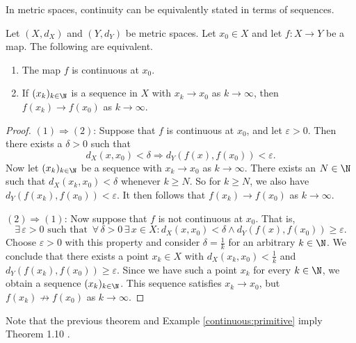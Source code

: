 \np

In metric spaces, continuity can be equivalently stated in terms of sequences.


\begin{theorem}\label{th:sequential}
Let $(X,d_X)$ and $(Y,d_Y)$ be metric spaces. Let $x_0 \in X$ and let $f : X \to Y$
be a map. The following are equivalent.
\begin{enumerate}
\item The map $f$ is continuous at $x_0$.
\item If $(x_k)_{k \in \N}$ is a sequence in $X$ with $x_k \to x_0$ as $k \to \infty$,
then $f(x_k) \to f(x_0)$ as $k \to \infty$.
\end{enumerate}
\end{theorem}

\np

\begin{proof}
$(1) \Rightarrow (2)$: Suppose that $f$ is continuous at $x_0$, and let $\varepsilon > 0$. Then there exists a $\delta > 0$ such that
\[
d_X(x,x_0) < \delta \Rightarrow d_Y(f(x),f(x_0)) < \varepsilon.
\]
Now let $(x_k)_{k \in \N}$ be
a sequence with $x_k \to x_0$ as $k \to \infty$. There exists an $N \in \N$ such that $d_X(x_k,x_0) < \delta$ whenever $k \ge N$.
So for $k \ge N$, we also have $d_Y(f(x_k),f(x_0)) < \varepsilon$. It then follows
that $f(x_k) \to f(x_0)$ as $k \to \infty$.

\bis

$(2) \Rightarrow (1)$: Now suppose that $f$ is not continuous at $x_0$. That is,
\[
\exists \,\varepsilon > 0 \,\,\textrm{such that } \, \forall\, \delta > 0 \, \exists\, x \in X: d_X(x,x_0) < \delta \wedge d_Y(f(x),f(x_0)) \ge \varepsilon.
\]
Choose $\varepsilon > 0$ with this property and consider $\delta = \frac{1}{k}$ for an
arbitrary $k \in \N$. We conclude that there exists a point $x_k \in X$ with
$d_X(x_k,x_0) < \frac{1}{k}$ and $d_Y(f(x_k),f(x_0)) \ge \varepsilon$.
Since we have such a point $x_k$ for every $k \in \N$, we obtain a sequence
$(x_k)_{k \in \N}$. This sequence satisfies $x_k \to x_0$, but $f(x_k) \not\to f(x_0)$
as $k \to \infty$.
\end{proof}


\np

\begin{remark}
Note that the previous theorem and Example \ref{continuous:primitive} imply 
Theorem 1.10%
.
\end{remark}

\bis



